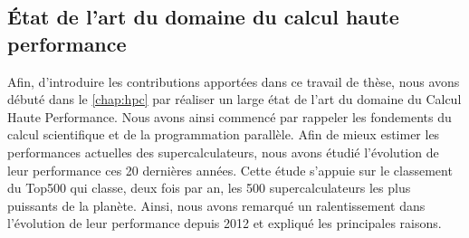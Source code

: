     \subsection{État de l'art du domaine du calcul haute performance}
        
        Afin, d'introduire les contributions apportées dans ce travail de thèse, nous avons débuté dans le \autoref{chap:hpc} par réaliser un large état de l'art du domaine du Calcul Haute Performance. Nous avons ainsi commencé par rappeler les fondements du calcul scientifique et de la programmation parallèle. Afin de mieux estimer les performances actuelles des supercalculateurs, nous avons étudié l'évolution de leur performance ces 20 dernières années. Cette étude s'appuie sur le classement du Top500 qui classe, deux fois par an, les 500 supercalculateurs les plus puissants de la planète. Ainsi, nous avons remarqué un ralentissement dans l'évolution de leur performance depuis 2012 et expliqué les principales raisons. 
        
